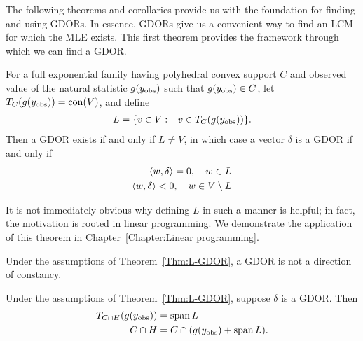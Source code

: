 The following theorems and corollaries provide us with the foundation
for finding and using GDORs.  In essence, GDORs give us a convenient way
to find an LCM for which the MLE exists.
This first theorem provides the framework through
which we can find a GDOR.  
\begin{theorem} \label{Thm:L-GDOR}
For a full exponential family having polyhedral convex support $C$ and observed value 
of the natural statistic $g(y_{\text{obs}})$ such that $g(y_{\text{obs}}) \in C$, 
let $T_C(g(y_{\text{obs}}) ) = \operatorname{con}(V)$, and define
\begin{align*}
	L = \{ v \in V: -v \in T_C(g(y_{\text{obs}})) \}.
\end{align*}
Then a GDOR exists if and only if $L \neq V$, in which case a vector $\delta$ is a GDOR if and 
only if
\begin{align*}
	\langle w, \delta \rangle = 0, \quad w \in L \\
	\langle w, \delta \rangle < 0, \quad w \in V \setminus L \\
\end{align*}
\end{theorem}
It is not immediately obvious why defining $L$ in such a manner is helpful; in fact,
the motivation is rooted in linear programming.  We demonstrate the application of 
this theorem in Chapter~\ref{Chapter:Linear programming}.

\begin{corollary}
Under the assumptions of Theorem~\ref{Thm:L-GDOR}, a GDOR is not a direction of constancy.
\end{corollary}

\begin{corollary} \label{Cor:spanL}
Under the assumptions of Theorem~\ref{Thm:L-GDOR}, suppose $\delta$ is a GDOR.  Then
\begin{align*}
	T_{C \cap H} (g(y_{\text{obs}})) &= \operatorname{span} L \\
	C \cap H &= C \cap (g(y_{\text{obs}}) + \operatorname{span} L ). \\
\end{align*}
\end{corollary}

